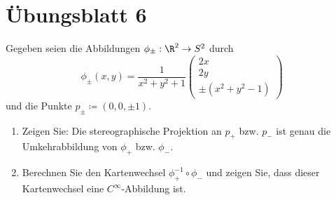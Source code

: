 %
\newpage
\setcounter{problemcounter}{0}
\section{Übungsblatt 6}

\begin{assignment}
  Gegeben seien die Abbildungen \( \phi_\pm : \R^2 \to S^2 \) durch
  \begin{equation*}
    \phi_\pm(x,y) = \frac{1}{x^2 + y^2 + 1} \left( \begin{smallmatrix}
      2x \\ 2y \\ \pm(x^2 + y^2 - 1)
    \end{smallmatrix} \right)
  \end{equation*}
  und die Punkte \( p_\pm \coloneqq (0,0,\pm 1) \).
  \begin{enumerate}[label=(\alph*)]
    \item Zeigen Sie: Die stereographische Projektion an \( p_+ \) bzw. \( p_- \) ist genau die Umkehrabbildung von \( \phi_+ \) bzw. \( \phi_- \).
    \item Berechnen Sie den Kartenwechsel \( \phi_+^{-1} \circ \phi_- \) und zeigen Sie, dass dieser Kartenwechsel eine \( C^\infty \)-Abbildung ist.
  \end{enumerate}
\end{assignment}
